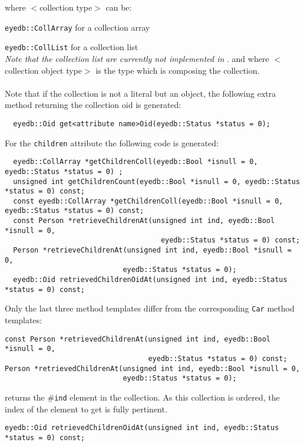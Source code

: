 \normalsize
where $<$collection type$>$ can be:
\be
\item \texttt{eyedb::CollArray} for a collection array
\item \texttt{eyedb::CollList} for a collection list\\
\emph{Note that the collection list are currently not implemented in
\eyedb}.
\ee
and where $<$collection object type$>$ is the type which is composing
the collection.
\\
\\
Note that if the collection is not a literal but an object, the following
extra method returning the collection oid is generated:
\verbsize
\begin{verbatim}
  eyedb::Oid get<attribute name>Oid(eyedb::Status *status = 0);
\end{verbatim}
\normalsize
For the \texttt{children} attribute the following code is generated:
\verbsize
\begin{verbatim}
  eyedb::CollArray *getChildrenColl(eyedb::Bool *isnull = 0, eyedb::Status *status = 0) ;
  unsigned int getChildrenCount(eyedb::Bool *isnull = 0, eyedb::Status *status = 0) const;
  const eyedb::CollArray *getChildrenColl(eyedb::Bool *isnull = 0, eyedb::Status *status = 0) const;
  const Person *retrieveChildrenAt(unsigned int ind, eyedb::Bool *isnull = 0,
                                     eyedb::Status *status = 0) const;
  Person *retrieveChildrenAt(unsigned int ind, eyedb::Bool *isnull = 0,
                            eyedb::Status *status = 0);
  eyedb::Oid retrievedChildrenOidAt(unsigned int ind, eyedb::Status *status = 0) const;
\end{verbatim}
\normalsize
Only the last three method templates differ from the corresponding
\texttt{Car} method templates:
\be
\item
\verbsize
\begin{verbatim}
const Person *retrievedChildrenAt(unsigned int ind, eyedb::Bool *isnull = 0,
                                  eyedb::Status *status = 0) const;
Person *retrievedChildrenAt(unsigned int ind, eyedb::Bool *isnull = 0,
                            eyedb::Status *status = 0);
\end{verbatim}
\normalsize
returns the \#\texttt{ind} element in the collection.
As this collection is ordered, the index of the element to get is fully
pertinent.
\item
\verbsize
\begin{verbatim}
eyedb::Oid retrievedChildrenOidAt(unsigned int ind, eyedb::Status *status = 0) const;
\end{verbatim}
